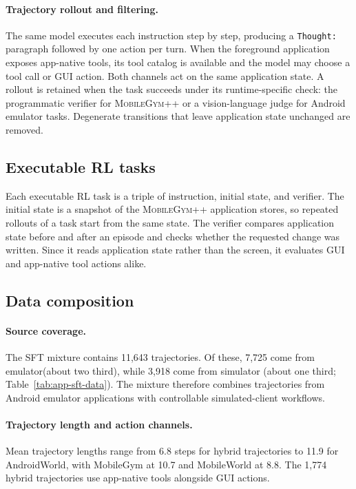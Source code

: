 \paragraph{Trajectory rollout and filtering.}
The same model executes each instruction step by step, producing a \texttt{Thought:} paragraph followed by one action per turn. When the foreground application exposes app-native tools, its tool catalog is available and the model may choose a tool call or GUI action. Both channels act on the same application state. A rollout is retained when the task succeeds under its runtime-specific check: the programmatic verifier for \textsc{MobileGym++} or a vision-language judge for Android emulator tasks. Degenerate transitions that leave application state unchanged are removed.

\subsection{Executable RL tasks}
\label{app:rl-data}
Each executable RL task is a triple of instruction, initial state, and verifier. The initial state is a snapshot of the \textsc{MobileGym++} application stores, so repeated rollouts of a task start from the same state. The verifier compares application state before and after an episode and checks whether the requested change was written. Since it reads application state rather than the screen, it evaluates GUI and app-native tool actions alike.

\subsection{Data composition}
\label{app:data-quality}

\paragraph{Source coverage.}
The SFT mixture contains 11,643 trajectories. Of these, 7,725 come from emulator(about two third), while 3,918 come from simulator (about one third; Table~\ref{tab:app-sft-data}). The mixture therefore combines trajectories from Android emulator applications with controllable simulated-client workflows.

\paragraph{Trajectory length and action channels.}
Mean trajectory lengths range from 6.8 steps for hybrid trajectories to 11.9 for AndroidWorld, with MobileGym at 10.7 and MobileWorld at 8.8. The 1,774 hybrid trajectories use app-native tools alongside GUI actions.

